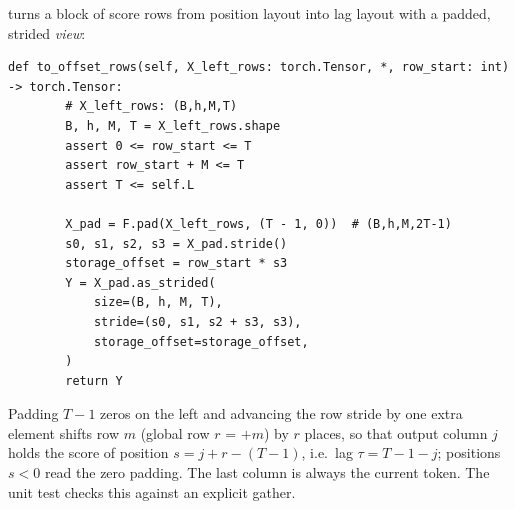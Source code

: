 \begin{implnote}[title={In the code: the lag (``offset'') layout without copying}]
 turns a block of score rows from position layout into lag
layout with a padded, strided \emph{view}:
\begin{lstlisting}[caption={Excerpt from \texttt{repos/\allowbreak{}LJC-FVNR\_\_HyperMLP/\allowbreak{}hyperglu.py}},label={lst:c04-hyper-align}]
    def to_offset_rows(self, X_left_rows: torch.Tensor, *, row_start: int) -> torch.Tensor:
        # X_left_rows: (B,h,M,T)
        B, h, M, T = X_left_rows.shape
        assert 0 <= row_start <= T
        assert row_start + M <= T
        assert T <= self.L

        X_pad = F.pad(X_left_rows, (T - 1, 0))  # (B,h,M,2T-1)
        s0, s1, s2, s3 = X_pad.stride()
        storage_offset = row_start * s3
        Y = X_pad.as_strided(
            size=(B, h, M, T),
            stride=(s0, s1, s2 + s3, s3),
            storage_offset=storage_offset,
        )
        return Y
\end{lstlisting}
Padding $T-1$ zeros on the left and advancing the row stride by one extra element shifts row $m$
(global row $r$ =  $+m$) by $r$ places, so that output column $j$ holds the score
of position $s=j+r-(T-1)$, i.e.\ lag $\tau=T-1-j$; positions $s<0$ read the zero padding. The last
column is always the current token. The unit test  checks this
against an explicit gather.
\end{implnote}

